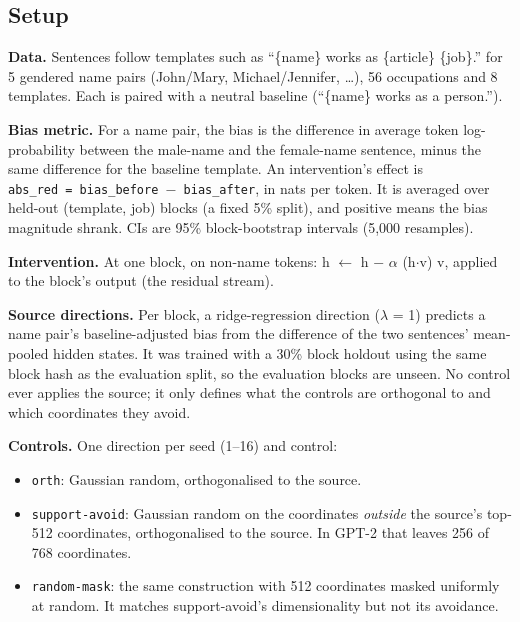 \documentclass[
  10pt,
]{article}
\providecommand{\tightlist}{%
  \setlength{\itemsep}{0pt}\setlength{\parskip}{0pt}}
\begin{document}
\subsection{Setup}\label{setup}

\textbf{Data.} Sentences follow templates such as ``\{name\} works as
\{article\} \{job\}.'' for 5 gendered name pairs (John/Mary,
Michael/Jennifer, \ldots), 56 occupations and 8 templates. Each is
paired with a neutral baseline (``\{name\} works as a person.'').

\textbf{Bias metric.} For a name pair, the bias is the difference in
average token log-probability between the male-name and the female-name
sentence, minus the same difference for the baseline template. An
intervention's effect is
\texttt{abs\_red\ =\ \textbar{}bias\_before\textbar{}\ $-$\ \textbar{}bias\_after\textbar{}},
in nats per token. It is averaged over held-out (template, job) blocks
(a fixed 5\% split), and positive means the bias magnitude shrank. CIs
are 95\% block-bootstrap intervals (5,000 resamples).

\textbf{Intervention.} At one block, on non-name tokens: h $\leftarrow$ h $-$ $\alpha$ (h$\cdot$v)
v, applied to the block's output (the residual stream).

\textbf{Source directions.} Per block, a ridge-regression direction ($\lambda$ =
1) predicts a name pair's baseline-adjusted bias from the difference of
the two sentences' mean-pooled hidden states. It was trained with a 30\%
block holdout using the same block hash as the evaluation split, so the
evaluation blocks are unseen. No control ever applies the source; it
only defines what the controls are orthogonal to and which coordinates
they avoid.

\textbf{Controls.} One direction per seed (1--16) and control:

\begin{itemize}
\tightlist
\item
  \texttt{orth}: Gaussian random, orthogonalised to the source.
\item
  \texttt{support-avoid}: Gaussian random on the coordinates
  \emph{outside} the source's top-512 \textbar coordinates\textbar,
  orthogonalised to the source. In GPT-2 that leaves 256 of 768
  coordinates.
\item
  \texttt{random-mask}: the same construction with 512 coordinates
  masked uniformly at random. It matches support-avoid's dimensionality
  but not its avoidance.
\end{itemize}
\end{document}
